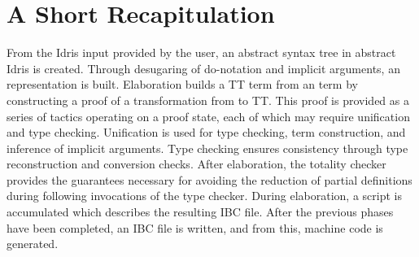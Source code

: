 \section{A Short Recapitulation}
From the Idris input provided by the user, an abstract syntax tree in abstract
Idris is created. Through desugaring of do-notation and implicit arguments, an
\IdrisM{} representation is built. Elaboration builds a TT term from an
\IdrisM{} term by constructing a proof of a transformation from \IdrisM{} to
TT. This proof is provided as a series of tactics operating on a proof state,
each of which may require unification and type checking. Unification is used for
type checking, term construction, and inference of implicit arguments. Type
checking ensures consistency through type reconstruction and conversion
checks. After elaboration, the totality checker provides the guarantees
necessary for avoiding the reduction of partial definitions during following
invocations of the type checker. During elaboration, a script is accumulated
which describes the resulting IBC file. After the previous phases have been
completed, an IBC file is written, and from this, machine code is generated.










